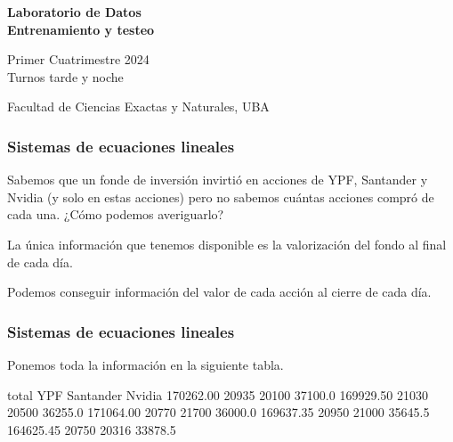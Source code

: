 \documentclass[aspectratio=169,12pt]{beamer}
\begin{document}

\begin{frame}

 \begin{center}

\Large\textbf{Laboratorio de Datos} \\
\large\textbf{Entrenamiento y testeo}




\vspace{1cm}
Primer Cuatrimestre 2024 \\ Turnos tarde y noche

\vspace{1cm}


 {\small Facultad de Ciencias Exactas y Naturales, UBA}
 \end{center}


\end{frame}


\begin{frame}
\frametitle{Sistemas de ecuaciones lineales}

Sabemos que un fonde de inversión invirtió en acciones de YPF, Santander y Nvidia (y solo en estas acciones) pero no sabemos cuántas acciones compró de cada una. ¿Cómo podemos averiguarlo? 

\pause

La única información que tenemos disponible es la valorización del fondo al final de cada día.

\pause

Podemos conseguir información del valor de cada acción al cierre de cada día. 


\end{frame}


\begin{frame}
\frametitle{Sistemas de ecuaciones lineales}

Ponemos toda la información en la siguiente tabla.

total	YPF	Santander	Nvidia
	170262.00	20935	20100	37100.0
	169929.50	21030	20500	36255.0
	171064.00	20770	21700	36000.0
	169637.35	20950	21000	35645.5
	164625.45	20750	20316	33878.5


\end{frame}
\end{document}
